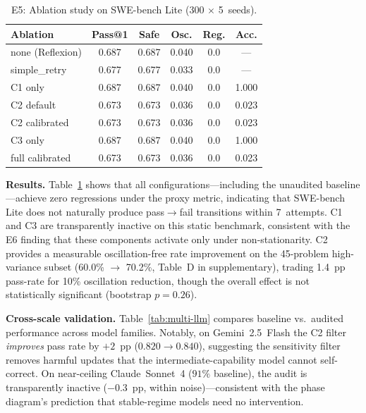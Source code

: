 \documentclass{article}
\begin{document}
\begin{table}[t]
  \centering
  \caption{E5: Ablation study on SWE-bench Lite (300 $\times$ 5~seeds).}
  \label{tab:e5}
  \small
  \begin{tabular}{lccccc}
    \toprule
    Ablation & Pass@1 & Safe & Osc. & Reg. & Acc. \\
    \midrule
    none (Reflexion)  & 0.687 & 0.687 & 0.040 & 0.0 & ---   \\
    simple\_retry     & 0.677 & 0.677 & 0.033 & 0.0 & ---   \\
    C1 only           & 0.687 & 0.687 & 0.040 & 0.0 & 1.000 \\
    C2 default        & 0.673 & 0.673 & 0.036 & 0.0 & 0.023 \\
    C2 calibrated     & 0.673 & 0.673 & 0.036 & 0.0 & 0.023 \\
    C3 only           & 0.687 & 0.687 & 0.040 & 0.0 & 1.000 \\
    full calibrated   & 0.673 & 0.673 & 0.036 & 0.0 & 0.023 \\
    \bottomrule
  \end{tabular}
\end{table}

\textbf{Results.}
Table~\ref{tab:e5} shows that all configurations---including the
unaudited baseline---achieve zero regressions under the proxy metric,
indicating that SWE-bench Lite does not naturally produce
pass$\to$fail transitions within 7~attempts. C1 and C3 are
transparently inactive on this static benchmark, consistent with
the E6 finding that these components activate only under
non-stationarity. C2 provides a measurable oscillation-free rate
improvement on the 45-problem high-variance subset
(60.0\% $\to$ 70.2\%, Table~D in supplementary),
trading 1.4~pp pass-rate for 10\% oscillation reduction, though
the overall effect is not statistically significant (bootstrap
$p{=}0.26$).

\textbf{Cross-scale validation.}
Table~\ref{tab:multi-llm} compares baseline vs.\ audited performance
across model families. Notably, on Gemini~2.5~Flash the C2 filter
\emph{improves} pass rate by $+2$~pp ($0.820 \to 0.840$), suggesting
the sensitivity filter removes harmful updates that the intermediate-capability
model cannot self-correct. On near-ceiling Claude~Sonnet~4 ($91\%$ baseline),
the audit is transparently inactive ($-0.3$~pp, within noise)---consistent
with the phase diagram's prediction that stable-regime models need no intervention.
\end{document}
